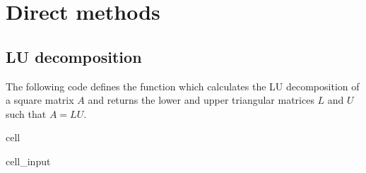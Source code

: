 \documentclass[letterpaper,10pt,english]{jupyterBook}
\begin{document}
\section{Direct methods}
\label{\detokenize{8_Appendices/8.1_Python:direct-methods}}

\subsection{LU decomposition}
\label{\detokenize{8_Appendices/8.1_Python:lu-decomposition}}
\sphinxAtStartPar
The following code defines the function  which calculates the LU decomposition of a square matrix \(A\) and returns the lower and upper triangular matrices \(L\) and \(U\) such that \(A = LU\).

\begin{sphinxuseclass}{cell}\begin{sphinxVerbatimInput}

\begin{sphinxuseclass}{cell_input}
\begin{sphinxVerbatim}[commandchars=\\\{\}]
 
      \PYG{p}{[}\PYG{p}{]}
         
       
             
               
                \PYG{p}{[}\PYG{p}{]}  \PYG{p}{[}\PYG{p}{]}  \PYG{p}{[}\PYG{p}{]}
                
            \PYG{p}{[}\PYG{p}{]}  \PYG{p}{[}\PYG{p}{]}  \PYG{p}{[}\PYG{p}{]}   
            
              
               
                \PYG{p}{[}\PYG{p}{]}  \PYG{p}{[}\PYG{p}{]}  \PYG{p}{[}\PYG{p}{]}
                

\end{sphinxVerbatim}
\end{sphinxuseclass}
\end{sphinxVerbatimInput}
\end{sphinxuseclass}
\end{document}
